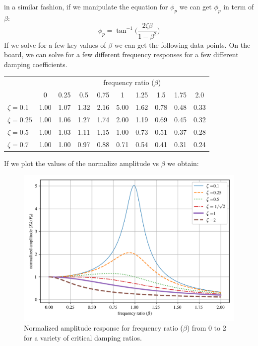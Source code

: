 \documentclass[12pt,letter]{article}
\numberwithin{ex}{section} %
\numberwithin{re}{section} %
\numberwithin{pr}{section} %
\begin{document}
			in a similar fashion, if we manipulate the equation for $\phi_p$ we can get $\phi_p$ in term of $\beta$:
			\begin{equation}
				\phi_p = \tan^{-1} \bigg(\frac{2 \zeta \beta}{1-\beta^2}\bigg)
			\end{equation}	
			If we solve for a few key values of $\beta$ we can get the following data points. On the board, we can solve for a few different frequency responses for a few different damping coefficients. 
			\begin{table}[H]
				\centering
				\begin{tabular}{@{}lccccccccc@{}}
				\toprule
				 & & \multicolumn{8}{c}{frequency ratio ($\beta$)} \\ 
				 & 0 & 0.25& 0.5& 0.75& 1& 1.25& 1.5& 1.75& 2.0 \\ \midrule
				$\zeta=0.1$	&	1.00&	1.07&	1.32&	2.16&	5.00&	1.62&	0.78&	0.48 & 0.33 \\ 
				$\zeta=0.25$	&	1.00&	1.06&	1.27&	1.74&	2.00&	1.19&	0.69&	0.45 & 0.32 \\ 
				$\zeta=0.5$	&	1.00&	1.03&	1.11&	1.15&	1.00&	0.73&	0.51&	0.37 & 0.28\\ 
				$\zeta=0.7$	&	1.00&  1.00	&   0.97&	0.88&	0.71&	0.54&	0.41&	0.31 & 0.24\\\bottomrule
				\end{tabular}
			\end{table}
			If we plot the values of the normalize amplitude vs $\beta$ we obtain:
			\begin{figure}[H]
				\centering
				\includegraphics[]{../figures/underdamped_frequency_response_amplitude.png}
				\caption{Normalized amplitude response for frequency ratio ($\beta$) from 0 to 2 for a variety of critical damping ratios.}
			\end{figure}			
\end{document}
